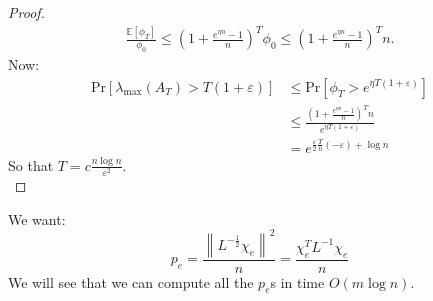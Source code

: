 \documentclass[11pt]{article}
\newcommand{\norm}[1]{\left\lVert#1\right\rVert}
\begin{document}
\begin{proof}
\begin{align*}
    \frac{\mathbb{E}[\phi_T]}{\phi_0} \leq \left(1 + \frac{e^{\eta n}-1}{n}\right)^T\phi_0 \leq \left(1 + \frac{e^{\eta n}-1}{n}\right)^Tn.
\end{align*}
Now:
\begin{align*}
 \text{Pr}\left[\lambda_{\max}(A_T) > T(1+\varepsilon)\right] &\leq \text{Pr}\left[\phi_{T} > e^{\eta T(1+ \varepsilon)}\right]\\
 & \leq \frac{\left(1+\frac{e^{\eta n}-1}{n}\right)^Tn}{e^{\eta T(1+\varepsilon)}}\\
 &= e^{\frac{\varepsilon}{2}\frac{T}{n}(-\varepsilon) + \log n}
\end{align*}
So that $T = c\frac{n \log n}{\varepsilon^2}$.\\
\end{proof}
We want:
\[
    p_e = \frac{\norm{L^{-\frac{1}{2}}\chi_e}^2}{n} = \frac{\chi_e^TL^{-1}\chi_e}{n}     
\]
We will see that we can compute all the $p_e$s in time $O(m \log n)$.
\section*{}
\end{document}
